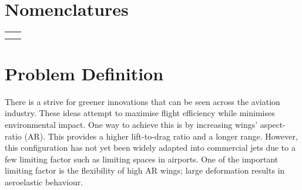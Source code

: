 \documentclass[11pt]{article}
\begin{document}
\newpage
\tableofcontents
\newpage
\listoffigures
\cleardoublepage
\listoftables

\section*{Nomenclatures}
\begin{table}[H]
    \centering
    \begin{tabular}{l c}
         &  \\
         & 
    \end{tabular}
    \label{tab:nomen}
\end{table}
\cleardoublepage
\newpage
\section{Problem Definition}
\label{sec:prob-def}
There is a strive for greener innovations that can be seen across the aviation industry. These ideas attempt to maximise flight efficiency while minimises environmental impact. One way to achieve this is by increasing wings' aspect-ratio (AR). This provides a higher lift-to-drag ratio and a longer range. However, this configuration has not yet been widely adapted into commercial jets due to a few limiting factor such as limiting spaces in airports. One of the important limiting factor is the flexibility of high AR wings; large deformation results in aeroelastic behaviour.\\ 
\end{document}
